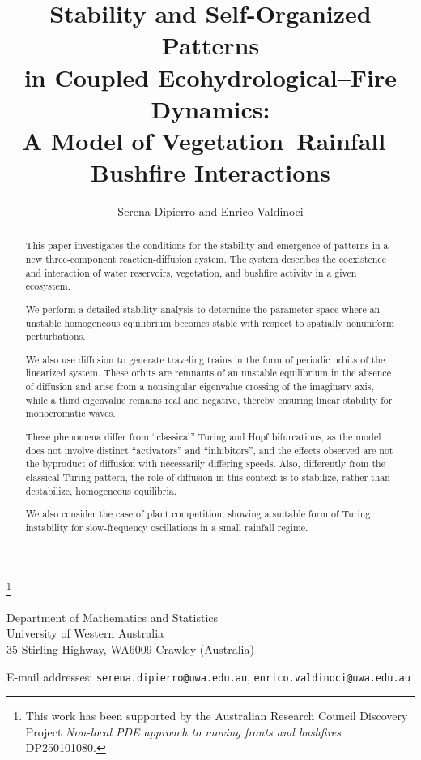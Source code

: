 \documentclass[12pt]{amsart}
\numberwithin{equation}{section}
\begin{document}
\title[Vegetation--Rainfall--Bushfire Interactions]{Stability and
Self-Organized Patterns \\ in Coupled Ecohydrological--Fire Dynamics: \\ A Model of Vegetation--Rainfall--Bushfire Interactions}\thanks{This work
has been supported by the Australian Research Council Discovery Project {\em Non-local PDE approach to moving fronts and bushfires} DP250101080.}

\author[Serena Dipierro and Enrico Valdinoci]{
Serena Dipierro
and
Enrico Valdinoci}


\maketitle

{\scriptsize \begin{center} Department of Mathematics and Statistics\\
University of Western Australia\\ 35 Stirling Highway, WA6009 Crawley (Australia)
\end{center} }
\bigskip

{\scriptsize\begin{center}
E-mail addresses:
{\tt serena.dipierro@uwa.edu.au},
{\tt enrico.valdinoci@uwa.edu.au}
\end{center}}\bigskip

\begin{abstract}
This paper investigates the conditions for the stability and emergence of patterns in
a new three-component reaction-diffusion system. The system describes the coexistence
and interaction of water reservoirs, vegetation, and bushfire activity in a given ecosystem.

We perform a detailed stability analysis to determine the parameter space where an unstable homogeneous equilibrium becomes stable with respect to spatially nonuniform perturbations.

We also use diffusion to generate traveling trains in the form of periodic orbits of the linearized system. These orbits are remnants of an unstable equilibrium in the absence of diffusion and arise from a nonsingular eigenvalue crossing of the imaginary axis, while a third eigenvalue remains real and negative, thereby ensuring linear stability for monocromatic waves.

These phenomena differ from ``classical'' Turing and Hopf bifurcations, as the model does not involve distinct ``activators'' and ``inhibitors'', and the effects observed are not the byproduct of diffusion with necessarily differing speeds. Also, differently from the classical Turing pattern, the role of diffusion in this context is to
stabilize, rather than destabilize, homogeneous equilibria.

We also consider the case of plant competition, showing a suitable form of Turing instability for
slow-frequency oscillations in a small rainfall regime.
\end{abstract}
\end{document}

